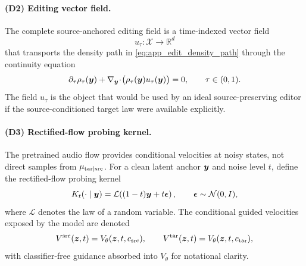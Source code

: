 \paragraph{(D2) Editing vector field.}
The complete source-anchored editing field is a time-indexed vector field
\begin{equation}
    \label{eq:app_edit_field}
    u_\tau:\mathcal{X}\rightarrow\mathbb{R}^{d}
\end{equation}
that transports the density path in \eqref{eq:app_edit_density_path} through the continuity equation
\begin{equation}
    \label{eq:app_continuity}
    \partial_\tau\rho_\tau(\boldsymbol{y})
    +
    \nabla_{\boldsymbol{y}}\!\cdot\!
    \big(\rho_\tau(\boldsymbol{y})u_\tau(\boldsymbol{y})\big)
    =
    0,
    \qquad
    \tau\in(0,1).
\end{equation}
The field $u_\tau$ is the object that would be used by an ideal source-preserving editor if the source-conditioned target law were available explicitly.

\paragraph{(D3) Rectified-flow probing kernel.}
The pretrained audio flow provides conditional velocities at noisy states, not direct samples from $\mu_{\mathrm{tar}|\mathrm{src}}$.
For a clean latent anchor $\boldsymbol{y}$ and noise level $t$, define the rectified-flow probing kernel
\begin{equation}
    \label{eq:app_rf_kernel}
    K_t(\cdot\mid \boldsymbol{y})
    =
    \mathcal{L}\!\left((1-t)\boldsymbol{y}+t\boldsymbol{\epsilon}\right),
    \qquad
    \boldsymbol{\epsilon}\sim\mathcal{N}(0,I),
\end{equation}
where $\mathcal{L}$ denotes the law of a random variable.
The conditional guided velocities exposed by the model are denoted
\begin{equation}
    \label{eq:app_guided_velocities}
    V^{\mathrm{src}}(\boldsymbol{z},t)
    =
    V_\theta(\boldsymbol{z},t,c_{\mathrm{src}}),
    \qquad
    V^{\mathrm{tar}}(\boldsymbol{z},t)
    =
    V_\theta(\boldsymbol{z},t,c_{\mathrm{tar}}),
\end{equation}
with classifier-free guidance absorbed into $V_\theta$ for notational clarity.

